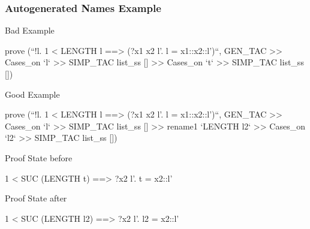 \begin{frame}[fragile]
\frametitle{Autogenerated Names Example}

\begin{alertblock}{Bad Example}
\begin{semiverbatim}\scriptsize
prove (``!l. 1 < LENGTH l ==> (?x1 x2 l'. l = x1::x2::l')``,
GEN_TAC >>
Cases_on `l` >> SIMP_TAC list_ss [] >>
Cases_on `t` >> SIMP_TAC list_ss [])
\end{semiverbatim}
\end{alertblock}

\begin{exampleblock}{Good Example}
\begin{semiverbatim}\scriptsize
prove (``!l. 1 < LENGTH l ==> (?x1 x2 l'. l = x1::x2::l')``,
GEN_TAC >>
Cases_on `l` >> SIMP_TAC list_ss [] >>
rename1 `LENGTH l2` >>
Cases_on `l2` >> SIMP_TAC list_ss [])
\end{semiverbatim}
\end{exampleblock}

\begin{block}{Proof State before }
\begin{semiverbatim}\scriptsize
1 < SUC (LENGTH t) ==> ?x2 l'. t = x2::l'
\end{semiverbatim}
\end{block}

\begin{block}{Proof State after }
\begin{semiverbatim}\scriptsize
1 < SUC (LENGTH l2) ==> ?x2 l'. l2 = x2::l'
\end{semiverbatim}
\end{block}

\end{frame}

